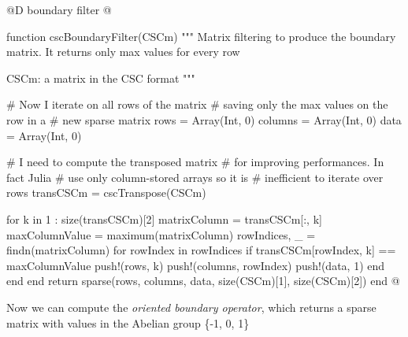 \documentclass[11pt,oneside]{article}	%
\begin{document}
@D boundary filter
@{function cscBoundaryFilter(CSCm)
  """
  Matrix filtering to produce the boundary
  matrix. It returns only max values for
  every row

  CSCm: a matrix in the CSC format
  """

  # Now I iterate on all rows of the matrix
  # saving only the max values on the row in a
  # new sparse matrix
  rows = Array(Int, 0)
  columns = Array(Int, 0)
  data = Array(Int, 0)
  
  # I need to compute the transposed matrix
  # for improving performances. In fact Julia
  # use only column-stored arrays so it is
  # inefficient to iterate over rows
  transCSCm = cscTranspose(CSCm)

  for k in 1 : size(transCSCm)[2]
    matrixColumn = transCSCm[:, k]
    maxColumnValue = maximum(matrixColumn)
    rowIndices, _ = findn(matrixColumn)
    for rowIndex in rowIndices
      if transCSCm[rowIndex, k] == maxColumnValue
        push!(rows, k)
        push!(columns, rowIndex)
        push!(data, 1)
      end
    end
  end
  return sparse(rows, columns, data, size(CSCm)[1], size(CSCm)[2])
end @}

Now we can compute the \textit{oriented boundary operator}, which returns a sparse matrix with values in the Abelian group \{-1, 0, 1\}
\end{document}
